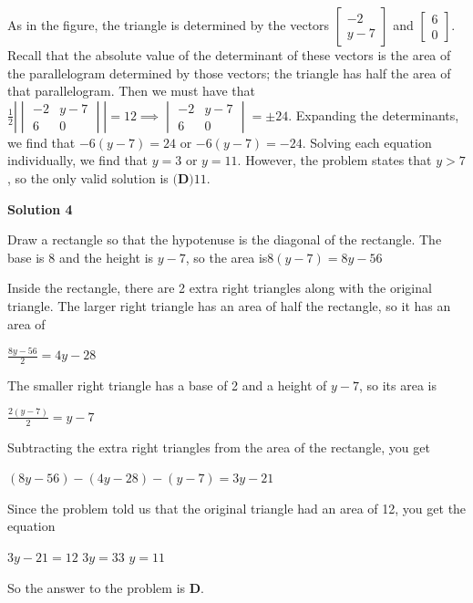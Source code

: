 \begin{enumerate}
As in the figure, the triangle is determined by the vectors $\begin{bmatrix}-2 \\ y-7\end{bmatrix}$ and $\begin{bmatrix}6\\0\end{bmatrix}$. Recall that the absolute value of the determinant of these vectors is the area of the parallelogram determined by those vectors; the triangle has half the area of that parallelogram. Then we must have that $\frac{1}{2}|\begin{vmatrix}-2 & y-7\\6 & 0\end{vmatrix}| = 12 \implies \begin{vmatrix}-2 & y-7\\6 & 0\end{vmatrix} = \pm 24$. Expanding the determinants, we find that $-6(y-7) = 24$ or $-6(y-7) = -24$. Solving each equation individually, we find that $y = 3$ or $y = 11$. However, the problem states that $y > 7$, so the only valid solution is $\boxed{\textbf{(D)} 11}$.

 



\textbf{Solution 4}

Draw a rectangle so that the hypotenuse is the diagonal of the rectangle. The base is 8 and the height is \( y - 7 \), so the area is${8(y - 7) = 8y - 56}$

 Inside the rectangle, there are 2 extra right triangles along with the original triangle. The larger right triangle has an area of half the rectangle, so it has an area of

 ${\frac{8y - 56}{2} = 4y - 28}$

 The smaller right triangle has a base of 2 and a height of \( y - 7 \), so its area is

 ${\frac{2(y - 7)}{2} = y - 7}$

 Subtracting the extra right triangles from the area of the rectangle, you get

 ${(8y - 56) - (4y - 28) - (y - 7) = 3y - 21}$

 Since the problem told us that the original triangle had an area of 12, you get the equation

 ${3y - 21 = 12}$
${3y = 33}$
${y = 11}$

 So the answer to the problem is \( \boxed{\textbf{D}} \).

 



\end{enumerate}
